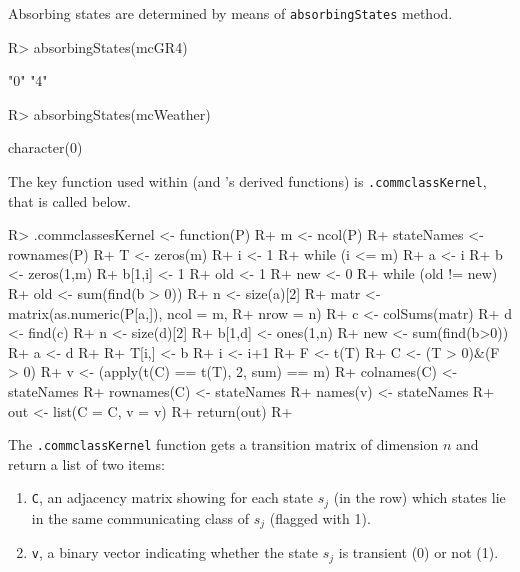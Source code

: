 \documentclass[article,nojss]{jss}
\providecommand{\tightlist}{%
  \setlength{\itemsep}{0pt}\setlength{\parskip}{0pt}}
\begin{document}
Absorbing states are determined by means of \texttt{absorbingStates} method.

\begin{CodeChunk}

\begin{CodeInput}
R> absorbingStates(mcGR4)
\end{CodeInput}

\begin{CodeOutput}
[1] "0" "4"
\end{CodeOutput}

\begin{CodeInput}
R> absorbingStates(mcWeather)
\end{CodeInput}

\begin{CodeOutput}
character(0)
\end{CodeOutput}
\end{CodeChunk}

The key function used within \cite{renaldoMatlab} (and 's derived functions) is \texttt{.commclassKernel}, that is called below.

\begin{CodeChunk}

\begin{CodeInput}
R> .commclassesKernel <- function(P){
R+   m <- ncol(P)
R+  stateNames <- rownames(P)
R+  T <- zeros(m) 
R+  i <- 1
R+  while (i <= m) { 
R+      a <- i 
R+      b <- zeros(1,m)
R+      b[1,i] <- 1
R+      old <- 1
R+      new <- 0
R+      while (old != new) {
R+          old <- sum(find(b > 0))
R+          n <- size(a)[2]
R+          matr <- matrix(as.numeric(P[a,]), ncol = m, 
R+                      nrow = n)
R+          c <- colSums(matr)
R+          d <- find(c)
R+          n <- size(d)[2]
R+          b[1,d] <- ones(1,n)
R+          new <- sum(find(b>0))
R+          a <- d
R+      }
R+      T[i,] <- b
R+      i <- i+1 }
R+  F <- t(T)  
R+  C <- (T > 0)&(F > 0)
R+  v <- (apply(t(C) == t(T), 2, sum) == m)
R+  colnames(C) <- stateNames
R+  rownames(C) <- stateNames
R+  names(v) <- stateNames
R+  out <- list(C = C, v = v)
R+  return(out)
R+ }
\end{CodeInput}
\end{CodeChunk}

The \texttt{.commclassKernel} function gets a transition matrix of dimension \(n\) and return a list of two items:

\begin{enumerate}
\def\labelenumi{\arabic{enumi}.}
\tightlist
\item
  \texttt{C}, an adjacency matrix showing for each state \(s_{j}\) (in the row) which states lie in the same communicating class of \(s_{j}\) (flagged with 1).
\item
  \texttt{v}, a binary vector indicating whether the state \(s_{j}\) is transient (0) or not (1).
\end{enumerate}
\end{document}

